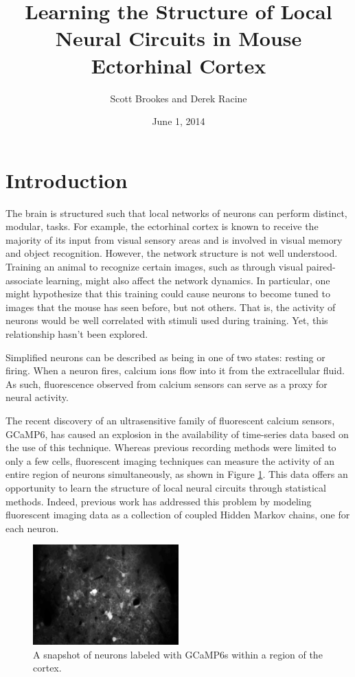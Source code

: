 \documentclass{article}
\title{Learning the Structure of Local Neural Circuits in Mouse Ectorhinal Cortex}
\author{Scott Brookes and Derek Racine}
\date{June 1, 2014}
\begin{document}
\maketitle

\section{Introduction}
The brain is structured such that local networks of neurons can perform 
distinct, modular, tasks. For example, the ectorhinal cortex is known to 
receive the majority of its input from visual sensory areas and is involved 
in visual memory and object recognition. However, the network structure is 
not well understood. Training an animal to recognize certain images, such as 
through visual paired-associate learning, might also affect the network 
dynamics. In particular, one might hypothesize that this training could cause 
neurons to become tuned to images that the mouse has seen before, but not 
others. That is, the activity of neurons would be well correlated with 
stimuli used during training. Yet, this relationship hasn't been 
explored. \par 

Simplified neurons can be described as being in one of two states: resting or 
firing. When a neuron fires, calcium ions flow into it from the extracellular 
fluid. As such, fluorescence observed from calcium sensors can serve as a 
proxy for neural activity. \par

The recent discovery of an ultrasensitive family of fluorescent calcium 
sensors, GCaMP6, has caused an explosion in the availability of time-series 
data based on the use of this technique.\cite{chen13} Whereas previous 
recording methods were limited to only a few cells, fluorescent imaging 
techniques can measure the activity of an entire region of neurons 
simultaneously, as shown in Figure \ref{neurons}. This data offers 
an opportunity to learn the structure of local neural circuits through 
statistical methods. Indeed, previous work has addressed this problem by 
modeling fluorescent imaging data as a collection of coupled Hidden Markov 
chains, one for each neuron.\cite{mishchenko11} \par

\begin{figure}[h]
  \centering
  \includegraphics[width=0.5\textwidth]{neurons}
  \caption{A snapshot of neurons labeled with GCaMP6s within a region of the cortex.}
  \label{neurons}
\end{figure}
\end{document}
